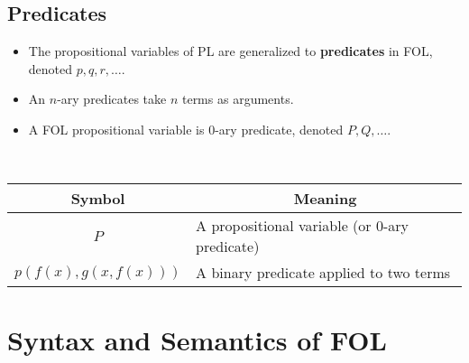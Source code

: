 \subsection{Predicates}
\begin{itemize}
	\item The propositional variables of \textsf{PL} are generalized to \textbf{predicates} in \textsf{FOL}, denoted $p,q,r,\dots$.
	\item An $n$-ary predicates take $n$ terms as arguments.
	\item A \textsf{FOL} propositional variable is $0$-ary predicate, denoted $P,Q,\dots$.
\end{itemize}
\begin{example}
\ \begin{table}[h!]\centering\begin{tabular}{c|l}
	\hline
	Symbol & \multicolumn{1}{c}{Meaning} \\ \hline
	$P$ & A propositional variable (or $0$-ary predicate) \\
	$p(f(x),g(x,f(x)))$ & A binary predicate applied to two terms\\ \hline
\end{tabular}
\end{table}
\end{example}

\section{Syntax and Semantics of FOL}
